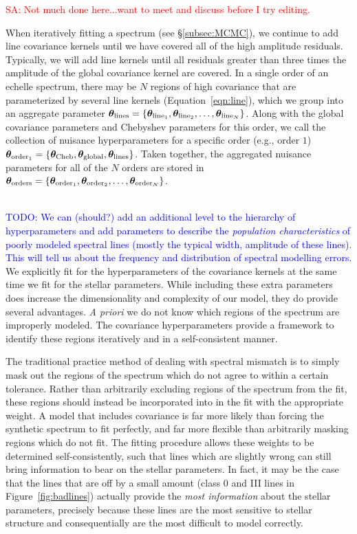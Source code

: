 \documentclass[iop,floatfix]{emulateapj}
\newcommand{\vt}{ {\bm \theta}}
\newcommand{\vtcheb}{\vt_{\rm Cheb}}
\newcommand{\vtglobal}{\vt_{\rm global}}
\newcommand{\vtorder}[1]{\vt_{{\rm order}_{#1}}}
\newcommand{\vtorders}{\vt_{\rm orders}}
\newcommand{\vtline}[1]{\vt_{{\rm line}_{#1}}}
\newcommand{\vtlines}{\vt_{\rm lines}}
\newcommand{\todo}[1]{ \textcolor{blue}{\\TODO: #1}}
\newcommand{\comm}[1]{ \textcolor{red}{SA: #1}}
\begin{document}
\comm{Not much done here...want to meet and discuss before I try editing.}

When iteratively fitting a spectrum (see \S\ref{subsec:MCMC}), we continue to add line covariance kernels until we have covered all of the high amplitude residuals. Typically, we will add line kernels until all residuals greater than three times the amplitude of the global covariance kernel are covered. In a single order of an echelle spectrum, there may be $N$ regions of high covariance that are parameterized by several line kernels (Equation~\ref{eqn:line}), which we group into an aggregate parameter $\vtlines = \{\vtline{1}, \vtline{2}, \ldots, \vtline{N}\}$. Along with the global covariance parameters and Chebyshev parameters for this order, we call the collection of nuisance hyperparameters for a specific order  (e.g., order $1$) $\vtorder{1} = \{\vtcheb, \vtglobal, \vtlines\}$. Taken together, the aggregated nuisance parameters for all of the $N$ orders are stored in $\vtorders = \{\vtorder{1}, \vtorder{2}, \ldots, \vtorder{N} \}$.

\todo{We can (should?) add an additional level to the hierarchy of
  hyperparameters and add parameters to describe the \emph{population
  characteristics} of poorly modeled spectral lines (mostly the typical width,
  amplitude of these lines).  This will tell us about the frequency and
distribution of spectral modelling errors.} We explicitly fit for the
hyperparameters of the covariance kernels at the same time we fit for the
stellar parameters. While including these extra parameters does increase the
dimensionality and complexity of our model, they do provide several advantages.
\emph{A priori} we do not know which regions of the spectrum are improperly
modeled. The covariance hyperparameters provide a framework to identify these
regions iteratively and in a self-consistent manner. 

The traditional practice method of dealing with spectral mismatch is to simply mask out the regions of the spectrum which do not agree to within a certain tolerance.  Rather than arbitrarily excluding regions of the spectrum from the fit, these regions should instead be incorporated into in the fit with the appropriate weight. A model that includes covariance is far more likely than forcing the synthetic spectrum to fit perfectly, and far more flexible than arbitrarily masking regions which do not fit. The fitting procedure allows these weights to be determined self-consistently, such that lines which are slightly wrong can still bring information to bear on the stellar parameters. In fact, it may be the case that the lines that are off by a small amount (class 0 and III lines in Figure~\ref{fig:badlines}) actually provide the \emph{most information} about the stellar parameters, precisely because these lines are the most sensitive to stellar structure and consequentially are the most difficult to model correctly.
\end{document}

